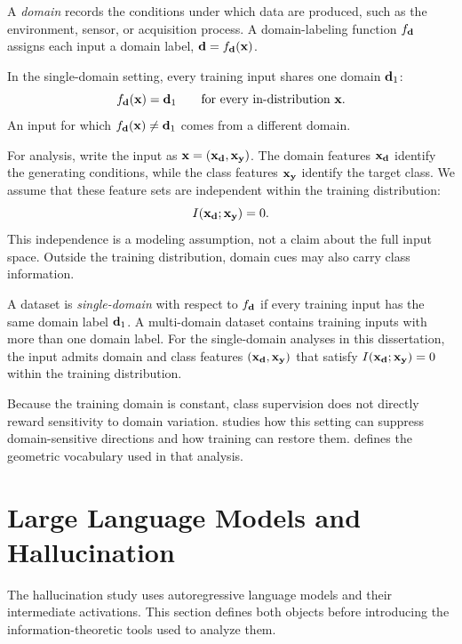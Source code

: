 A \emph{domain} records the conditions under which data are produced, such as the
environment, sensor, or acquisition process. A domain-labeling function
$f_{{\mathbf{d}}}$ assigns each input a domain label,
${\mathbf{d}} = f_{{\mathbf{d}}}({\mathbf{x}})$.

In the single-domain setting, every training input shares one domain ${\mathbf{d}}_1$:
\[
  f_{{\mathbf{d}}}({\mathbf{x}}) = {\mathbf{d}}_1
  \qquad \text{for every in-distribution } {\mathbf{x}}.
\]
An input for which $f_{{\mathbf{d}}}({\mathbf{x}}) \neq {\mathbf{d}}_1$ comes from a different domain.

For analysis, write the input as ${\mathbf{x}}=({\mathbf{x}}_{{\mathbf{d}}},{\mathbf{x}}_{{\mathbf{y}}})$. The domain
features ${\mathbf{x}}_{{\mathbf{d}}}$ identify the generating conditions, while the class features
${\mathbf{x}}_{{\mathbf{y}}}$ identify the target class. We assume that these feature sets are
independent within the training distribution:
\[
  I({\mathbf{x}}_{{\mathbf{d}}};{\mathbf{x}}_{{\mathbf{y}}})=0.
\]
This independence is a modeling assumption, not a claim about the full input
space. Outside the training distribution, domain cues may also carry class
information.

\begin{definition}
A dataset is \emph{single-domain} with respect to $f_{{\mathbf{d}}}$ if every training
input has the same domain label ${\mathbf{d}}_1$. A multi-domain dataset contains training
inputs with more than one domain label. For the single-domain analyses in this
dissertation, the input admits domain and class features
$({\mathbf{x}}_{{\mathbf{d}}},{\mathbf{x}}_{{\mathbf{y}}})$ that satisfy
$I({\mathbf{x}}_{{\mathbf{d}}};{\mathbf{x}}_{{\mathbf{y}}})=0$ within the training distribution.
\label{def:bg:singledomain}
\end{definition}

Because the training domain is constant, class supervision does not directly
reward sensitivity to domain variation. 
studies how this setting can suppress domain-sensitive directions and how training
can restore them.  defines the geometric vocabulary used in
that analysis.

\section{Large Language Models and Hallucination}
\label{sec:bg:llm}

The hallucination study uses autoregressive language models and their intermediate
activations. This section defines both objects before introducing the
information-theoretic tools used to analyze them.


